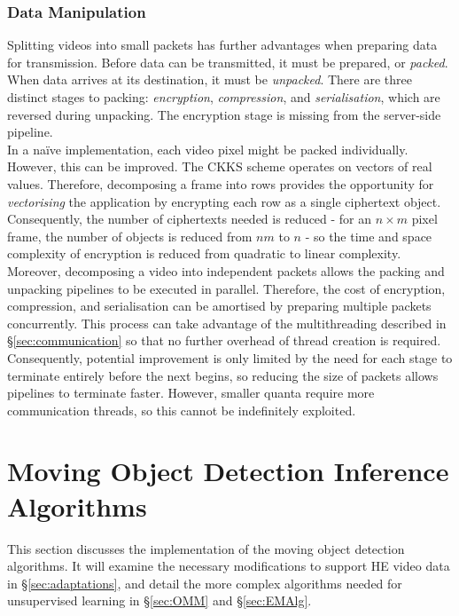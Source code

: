 \subsubsection{Data Manipulation}
\indent \indent
Splitting videos into small packets has further advantages when preparing data for transmission. Before data can be transmitted, it must be prepared, or \textit{packed}. When data arrives at its destination, it must be \textit{unpacked}. There are three distinct stages to packing: \textit{encryption}, \textit{compression}, and \textit{serialisation}, which are reversed during unpacking. The encryption stage is missing from the server-side pipeline.
\smallskip \\ \indent
In a na\"ive implementation, each video pixel might be packed individually. However, this can be improved. The CKKS scheme operates on vectors of real values. Therefore, decomposing a frame into rows provides the opportunity for \textit{vectorising} the application by encrypting each row as a single ciphertext object. Consequently, the number of ciphertexts needed is reduced - for an $n \times m$ pixel frame, the number of objects is reduced from $nm$ to $n$ - so the time and space complexity of encryption is reduced from quadratic to linear complexity.
\smallskip \\ \indent
Moreover, decomposing a video into independent packets allows the packing and unpacking pipelines to be executed in parallel. Therefore, the cost of encryption, compression, and serialisation can be amortised by preparing multiple packets concurrently. This process can take advantage of the multithreading described in §\ref{sec:communication} so that no further overhead of thread creation is required. Consequently, potential improvement is only limited by the need for each stage to terminate entirely before the next begins, so reducing the size of packets allows pipelines to terminate faster. However, smaller quanta require more communication threads, so this cannot be indefinitely exploited.





\section{Moving Object Detection Inference Algorithms}
\label{sec:inference}
\indent \indent
This section discusses the implementation of the moving object detection algorithms. It will examine the necessary modifications to support HE video data in §\ref{sec:adaptations}, and detail the more complex algorithms needed for unsupervised learning in §\ref{sec:OMM} and §\ref{sec:EMAlg}.
